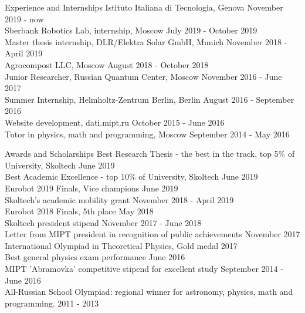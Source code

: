 \documentclass{resume} %
\begin{document}
\begin{rSection}{Experience and Internships} \itemsep -3pt  
{Istituto Italiana di Tecnologia, Genova} \hfill November 2019 - now \\
{Sberbank Robotics Lab, internship, Moscow} \hfill July 2019 - October 2019 \\
{Master thesis internship, DLR/Elektra Solar GmbH, Munich} \hfill November 2018 - April 2019 \\ 
{Agrocompost LLC, Moscow} \hfill August 2018 - October 2018 \\
{Junior Researcher, Russian Quantum Center, Moscow} \hfill November 2016 - June 2017 \\
{Summer Internship, Helmholtz-Zentrum Berlin, Berlin} \hfill August 2016 - September 2016\\
{Website development, dati.mipt.ru} \hfill October 2015 - June 2016 \\
{Tutor in physics, math and programming, Moscow} \hfill September 2014 - May 2016 \\
\end{rSection} 


\begin{rSection}{Awards and Scholarships} \itemsep -3pt  
{Best Research Thesis - the best in the track, top 5\% of University, Skoltech} \hfill June 2019 \\
{Best Academic Excellence - top 10\% of University, Skoltech} \hfill June 2019 \\
{Eurobot 2019 Finals, Vice champions} \hfill June 2019 \\
{Skoltech's academic mobility grant} \hfill November 2018 - April 2019 \\  
{Eurobot 2018 Finals, 5th place} \hfill May 2018 \\
{Skoltech president stipend} \hfill November 2017 - June 2018 \\
{Letter from MIPT president in recognition of public achievements} \hfill November 2017\\
{International Olympiad in Theoretical Physics, Gold medal} \hfill 2017 \\
{Best general physics exam performance} \hfill June 2016 \\
{MIPT 'Abramovka' competitive stipend for excellent study} \hfill September 2014 - June 2016 \\
{All-Russian School Olympiad: regional winner for astronomy, physics, math and programming.} \hfill 2011 - 2013 \\
\end{rSection} 
\end{document}
